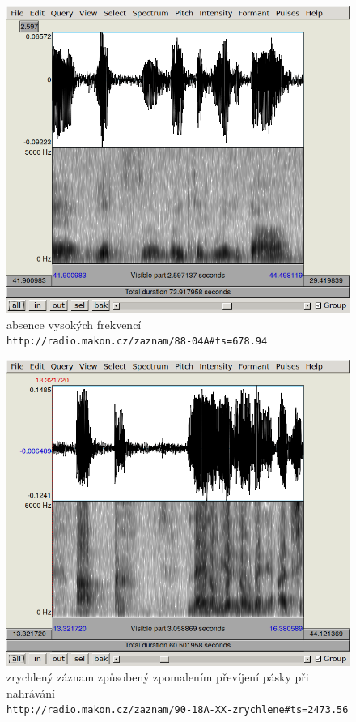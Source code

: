 \begin{figure}[htpb]
\includegraphics[scale=0.89]{rc/spectrum-nohighs-88-04A.png}
\caption{
    absence vysokých frekvencí\\
    \texttt{http://radio.makon.cz/zaznam/88-04A\#ts=678.94}
}
\label{fig:spectr-nohi}
\end{figure}


\begin{figure}[htpb]
\includegraphics[scale=0.89]{rc/spectrum-accel-90-18A.png}
\caption{
    zrychlený záznam způsobený zpomalením převíjení pásky při nahrávání\\
    \texttt{http://radio.makon.cz/zaznam/90-18A-XX-zrychlene\#ts=2473.56}
}
\label{fig:spectr-accel}
\end{figure}

